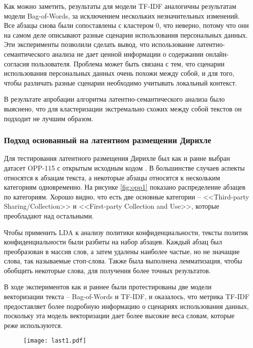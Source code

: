 \documentclass[../main]{subfiles}
\begin{document}
Как можно заметить, результаты для модели TF-IDF аналогичны результатам модели Bag-of-Words, за исключением нескольких незначительных изменений. Все абзацы снова были сопоставлены с кластером 0, что неверно, потому что они на самом деле описывают разные сценарии использования персональных данных. Эти эксперименты позволили сделать вывод, что использование латентно-семантического анализа не дает ценной информации о содержании онлайн-согласия пользователя. Проблема может быть связана с тем, что сценарии использования персональных данных очень похожи между собой, и для того, чтобы различать разные сценарии необходимо учитывать локальный контекст.

В результате апробации алгоритма латентно-семантического анализа было выяснено, что для кластеризации экстремально схожих между собой текстов он подходит не лучшим образом.

\subsubsection{Подход основанный на латентном размещении Дирихле}

Для тестирования латентного размещения Дирихле был как и ранне выбран датасет OPP-115 с открытым исходным кодом \cite{MDPI18}. В большинстве случаев аспекты относятся к абзацам текста, а некоторые абзацы относятся к нескольким категориям одновременно. На рисунке \ref{fig:opp1} показано распределение абзацев по категориям. Хорошо видно, что есть две основные категории – <<Third-party Sharing/Collection>> и <<First-party Collection and Use>>, которые преобладают над остальными.

Чтобы применить LDA к анализу политики конфиденциальности, тексты политик конфиденциальности были разбиты на набор абзацев. Каждый абзац был преобразован в массив слов, а затем удалены наиболее частые, но не значащие слова, так называемые стоп-слова. Также была выполнена лемматизация, чтобы обобщить некоторые слова, для получения более точных результатов.

В ходе экспериментов как и раннее были протестированы две модели векторизации текста – Bag-of-Words и TF-IDF, и оказалось, что метрика TF-IDF предоставляет более подробную информацию о сценариях использования данных, поскольку эта модель векторизации дает более высокие веса словам, которые реже используются.

\begin{figure}[H]
    \centering
    {\texttt{[image: last1.pdf]}}
    \vspace{-\baselineskip}
\end{figure}
\end{document}
